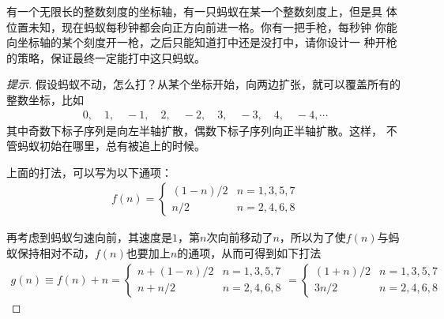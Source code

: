 \begin{example}[Google面试题]
  有一个无限长的整数刻度的坐标轴，有一只蚂蚁在某一个整数刻度上，但是具
  体位置未知，现在蚂蚁每秒钟都会向正方向前进一格。你有一把手枪，每秒钟
  你能向坐标轴的某个刻度开一枪，之后只能知道打中还是没打中，请你设计一
  种开枪的策略，保证最终一定能打中这只蚂蚁。
\end{example}
\begin{proof}[提示]
  假设蚂蚁不动，怎么打？从某个坐标开始，向两边扩张，就可以覆盖所有的整数坐标，比如
  \begin{align*}
    0,\quad 1,\quad -1,\quad 2,\quad -2,\quad 3,\quad -3, \quad 4,\quad -4, \cdots
  \end{align*}
  其中奇数下标子序列是向左半轴扩散，偶数下标子序列向正半轴扩散。这样，
  不管蚂蚁初始在哪里，总有被追上的时候。

  上面的打法，可以写为以下通项：
  \begin{align*}
    f(n) =
    \begin{cases}
      (1 - n) / 2 & n = 1, 3, 5, 7\\
      n / 2       & n = 2, 4, 6, 8
    \end{cases}
  \end{align*}

  再考虑到蚂蚁匀速向前，其速度是$1$，第$n$次向前移动了$n$，所以为了使$f(n)$与蚂蚁保持相对不动，$f(n)$也要加上$n$的通项，从而可得到如下打法
  \begin{align*}
    g(n)\equiv f(n) + n=
    \begin{cases}
      n + (1 - n) / 2 & n = 1, 3, 5, 7\\
      n + n / 2       & n = 2, 4, 6, 8
    \end{cases}=
    \begin{cases}
      (1 + n) / 2 & n = 1, 3, 5, 7\\
      3n/2       & n = 2, 4, 6, 8
    \end{cases}
  \end{align*}
\end{proof}